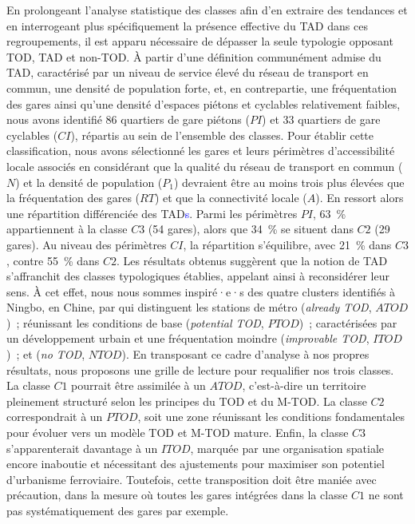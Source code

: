 \begin{refsegment}
En prolongeant l'analyse statistique des classes afin d'en extraire des tendances et en interrogeant plus spécifiquement la présence effective du \acrshort{TAD} dans ces regroupements, il est apparu nécessaire de dépasser la seule typologie opposant \acrshort{TOD}, \acrshort{TAD} et non-\acrshort{TOD}. À partir d’une définition communément admise du \acrshort{TAD}, caractérisé par un niveau de service élevé du réseau de transport en commun, une densité de population forte, et, en contrepartie, une fréquentation des gares ainsi qu’une densité d’espaces piétons et cyclables relativement faibles, nous avons identifié 86 quartiers de gare piétons (\(PI\)) et 33 quartiers de gare cyclables (\(CI\)), répartis au sein de l'ensemble des classes. Pour établir cette classification, nous avons sélectionné les gares et leurs périmètres d’accessibilité locale associés en considérant que la qualité du réseau de transport en commun (\(N\)) et la densité de population (\(P_1\)) devraient être au moins trois plus élevées que la fréquentation des gares (\(RT\)) et que la connectivité locale (\(A\)). En ressort alors une répartition différenciée des \acrshort{TAD}\textcolor{blue}{s}. Parmi les périmètres \(PI\), 63~\% appartiennent à la classe \(C3\) (54 gares), alors que 34~\% se situent dans \(C2\) (29 gares). Au niveau des périmètres \(CI\), la répartition s'équilibre, avec 21~\% dans \(C3\), contre 55~\% dans \(C2\). Les résultats obtenus suggèrent que la notion de \acrshort{TAD} s'affranchit des classes typologiques établies, appelant ainsi à reconsidérer leur sens. À cet effet, nous nous sommes inspiré·e·s des quatre clusters identifiés à Ningbo, en Chine, par \textcolor{blue}{\textcite[249]{yang_tod_2021}} qui distinguent les stations de métro  (\textsl{already TOD}, \(ATOD\))~;  réunissant les conditions de base (\textsl{potential TOD}, \(PTOD\))~;  caractérisées par un développement urbain et une fréquentation moindre (\textsl{improvable TOD}, \(ITOD\))~; et  (\textsl{no TOD}, \(NTOD\)). En transposant ce cadre d’analyse à nos propres résultats, nous proposons une grille de lecture pour requalifier nos trois classes. La classe \(C1\) pourrait être assimilée à un \(ATOD\), c'est-à-dire un territoire pleinement structuré selon les principes du \acrshort{TOD} et du \acrshort{M-TOD}. La classe \(C2\) correspondrait à un \(PTOD\), soit une zone réunissant les conditions fondamentales pour évoluer vers un modèle \acrshort{TOD} et \acrshort{M-TOD} mature. Enfin, la classe \(C3\) s'apparenterait davantage à un \(ITOD\), marquée par une organisation spatiale encore inaboutie et nécessitant des ajustements pour maximiser son potentiel d'urbanisme ferroviaire. Toutefois, cette transposition doit être maniée avec précaution, dans la mesure où toutes les gares intégrées dans la classe \(C1\) ne sont pas systématiquement des gares  par exemple.%


\end{refsegment}
